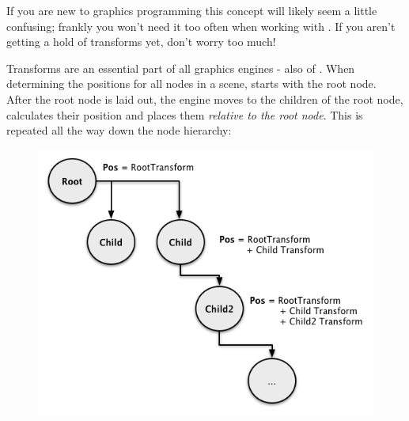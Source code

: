 If you are new to graphics programming this concept will likely seem a little
confusing; frankly you won't need it too often when working with \cocos{}. If
you aren't getting a hold of transforms yet, don't worry too much!

\begin{details}
Transforms are an essential part of all graphics engines - also of \cocos{}.
When determining the positions for all nodes in a scene, \cocos{} starts with
the root node. After the root node is laid out, the engine moves to the children
of the root node, calculates their position and places them \textit{relative to
the root node}. This is repeated all the way down the node hierarchy:
\begin{figure}[H]
		\centering
		\includegraphics[width=0.5\linewidth]{images/Chapter3/parent_transform_rendering.png}
\end{figure}
\end{details}

